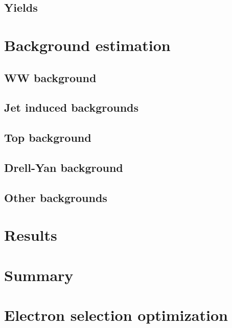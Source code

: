 \documentclass{cmspaper}
\begin{document}
  \subsection{Yields}
    \label{sec:yields}
%    

\section{Background estimation}
    \label{sec:bkg_intro}
%    
  \subsection{WW background}
    \label{sec:bkg_ww}
%    
  \subsection{Jet induced backgrounds}
    \label{sec:bkg_fakes}
%    
  \subsection{Top background}
    \label{sec:bkg_top}
%    
  \subsection{Drell-Yan background}
    \label{sec:bkg_dy}
%    
  \subsection{Other backgrounds}
    \label{sec:bkg_other}
%    

\section{Results}
    \label{sec:results}
%    

\section{Summary}
    \label{sec:summary}
%    

\clearpage



\appendix
\appendixpage
  \section{Electron selection optimization}
     \label{app:els}
%     
\end{document}

